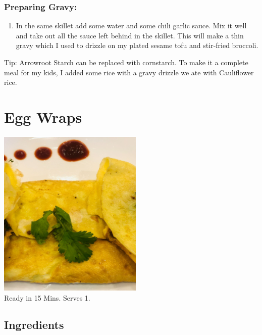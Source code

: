 \documentclass[
  oneside]{book}
\providecommand{\tightlist}{%
  \setlength{\itemsep}{0pt}\setlength{\parskip}{0pt}}
\begin{document}
\hypertarget{preparing-gravy}{%
\subsubsection{Preparing Gravy:}\label{preparing-gravy}}

\begin{enumerate}
\def\labelenumi{\arabic{enumi}.}
\tightlist
\item
  In the same skillet add some water and some chili garlic sauce. Mix it well and take out all the sauce left behind in the skillet. This will make a thin gravy which I used to drizzle on my plated sesame tofu and stir-fried broccoli.
\end{enumerate}

Tip:
Arrowroot Starch can be replaced with cornstarch. To make it a complete meal for my kids, I added some rice with a gravy drizzle we ate with Cauliflower rice.

\hypertarget{egg-wraps}{%
\section{Egg Wraps}\label{egg-wraps}}

\includegraphics{pictures/egg-wraps.png}\\
Ready in 15 Mins. Serves 1.

\hypertarget{ingredients-1}{%
\subsection{Ingredients}\label{ingredients-1}}
\end{document}
